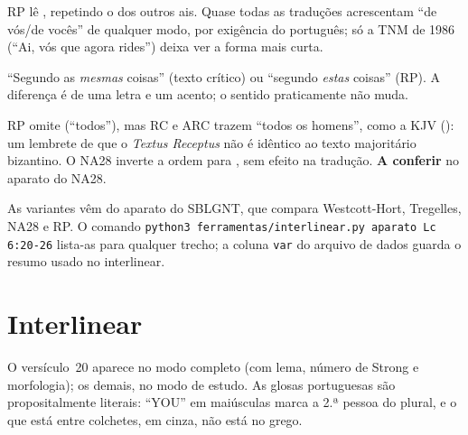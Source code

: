 \begin{variante}
RP lê , repetindo o  dos outros ais. Quase
todas as traduções acrescentam \enquote{de vós/de vocês} de qualquer modo, por
exigência do português; só a TNM de 1986 (\enquote{Ai, vós que agora rides})
deixa ver a forma mais curta.
\end{variante}

\begin{variante}
\enquote{Segundo as \emph{mesmas} coisas} (texto crítico) ou \enquote{segundo
\emph{estas} coisas} (RP). A diferença é de uma letra e um acento; o sentido
praticamente não muda.
\end{variante}

\begin{variante}
RP omite  (\enquote{todos}), mas RC e ARC trazem \enquote{todos os
homens}, como a KJV (): um lembrete de que o \emph{Textus Receptus}
não é idêntico ao texto majoritário bizantino. O NA28 inverte a ordem para
, sem efeito na tradução. \textbf{A conferir} no aparato do
NA28.
\end{variante}

\begin{nota}
As variantes vêm do aparato do SBLGNT, que compara Westcott-Hort, Tregelles,
NA28 e RP. O comando \texttt{python3 ferramentas/interlinear.py aparato Lc 6:20-26}
lista-as para qualquer trecho; a coluna \texttt{var} do arquivo de dados guarda
o resumo usado no interlinear.
\end{nota}

\section{Interlinear}

O versículo~20 aparece no modo completo (com lema, número de Strong e
morfologia); os demais, no modo de estudo. As glosas portuguesas são
propositalmente literais: \enquote{YOU} em maiúsculas marca a 2.ª pessoa do
plural, e o que está entre colchetes, em cinza, não está no grego.



